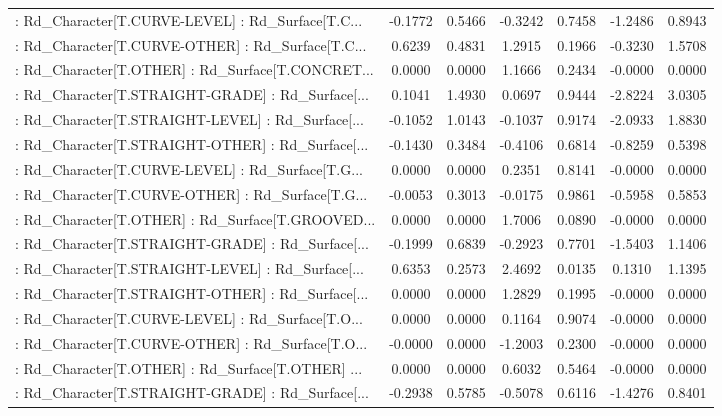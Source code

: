 \begin{longtable}{p{4cm}cccccc}
 : Rd\_Character[T.CURVE-LEVEL] : Rd\_Surface[T.C... & -0.1772 &    0.5466 & -0.3242 &       0.7458 & -1.2486 &  0.8943 \\
 : Rd\_Character[T.CURVE-OTHER] : Rd\_Surface[T.C... &  0.6239 &    0.4831 &  1.2915 &       0.1966 & -0.3230 &  1.5708 \\
 : Rd\_Character[T.OTHER] : Rd\_Surface[T.CONCRET... &  0.0000 &    0.0000 &  1.1666 &       0.2434 & -0.0000 &  0.0000 \\
 : Rd\_Character[T.STRAIGHT-GRADE] : Rd\_Surface[... &  0.1041 &    1.4930 &  0.0697 &       0.9444 & -2.8224 &  3.0305 \\
 : Rd\_Character[T.STRAIGHT-LEVEL] : Rd\_Surface[... & -0.1052 &    1.0143 & -0.1037 &       0.9174 & -2.0933 &  1.8830 \\
 : Rd\_Character[T.STRAIGHT-OTHER] : Rd\_Surface[... & -0.1430 &    0.3484 & -0.4106 &       0.6814 & -0.8259 &  0.5398 \\
 : Rd\_Character[T.CURVE-LEVEL] : Rd\_Surface[T.G... &  0.0000 &    0.0000 &  0.2351 &       0.8141 & -0.0000 &  0.0000 \\
 : Rd\_Character[T.CURVE-OTHER] : Rd\_Surface[T.G... & -0.0053 &    0.3013 & -0.0175 &       0.9861 & -0.5958 &  0.5853 \\
 : Rd\_Character[T.OTHER] : Rd\_Surface[T.GROOVED... &  0.0000 &    0.0000 &  1.7006 &       0.0890 & -0.0000 &  0.0000 \\
 : Rd\_Character[T.STRAIGHT-GRADE] : Rd\_Surface[... & -0.1999 &    0.6839 & -0.2923 &       0.7701 & -1.5403 &  1.1406 \\
 : Rd\_Character[T.STRAIGHT-LEVEL] : Rd\_Surface[... &  0.6353 &    0.2573 &  2.4692 &       0.0135 &  0.1310 &  1.1395 \\
 : Rd\_Character[T.STRAIGHT-OTHER] : Rd\_Surface[... &  0.0000 &    0.0000 &  1.2829 &       0.1995 & -0.0000 &  0.0000 \\
 : Rd\_Character[T.CURVE-LEVEL] : Rd\_Surface[T.O... &  0.0000 &    0.0000 &  0.1164 &       0.9074 & -0.0000 &  0.0000 \\
 : Rd\_Character[T.CURVE-OTHER] : Rd\_Surface[T.O... & -0.0000 &    0.0000 & -1.2003 &       0.2300 & -0.0000 &  0.0000 \\
 : Rd\_Character[T.OTHER] : Rd\_Surface[T.OTHER] ... &  0.0000 &    0.0000 &  0.6032 &       0.5464 & -0.0000 &  0.0000 \\
 : Rd\_Character[T.STRAIGHT-GRADE] : Rd\_Surface[... & -0.2938 &    0.5785 & -0.5078 &       0.6116 & -1.4276 &  0.8401 \\

\end{longtable}
